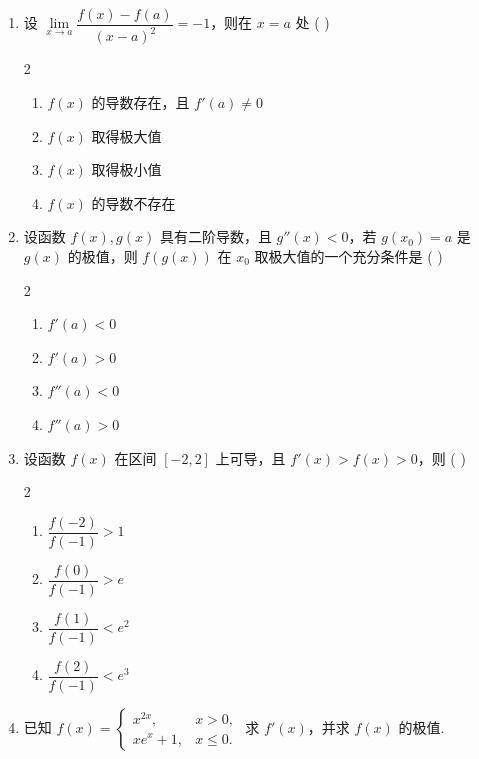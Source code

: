 \begin{enumerate}[label=\textbf{\arabic*.}, itemsep=6cm]
    \item 设 $\lim\limits_{x\to a}\dfrac{f(x)-f(a)}{(x-a)^2}=-1$，则在 $x=a$ 处 ( )
    \begin{multicols}{2}
    \begin{enumerate}
        \item $f(x)$ 的导数存在，且 $f'(a)\ne0$
        \item $f(x)$ 取得极大值
        \item $f(x)$ 取得极小值
        \item $f(x)$ 的导数不存在
    \end{enumerate}
    \end{multicols}
    
    \item 设函数 $f(x),g(x)$ 具有二阶导数，且 $g''(x)<0$，若 $g(x_0)=a$ 是 $g(x)$ 的极值，则 $f(g(x))$ 在 $x_0$ 取极大值的一个充分条件是 ( )
    \begin{multicols}{2}
    \begin{enumerate}
        \item $f'(a)<0$
        \item $f'(a)>0$
        \item $f''(a)<0$
        \item $f''(a)>0$
    \end{enumerate}
    \end{multicols}
    
    \item 设函数 $f(x)$ 在区间 $[-2,2]$ 上可导，且 $f'(x)>f(x)>0$，则 ( )
    \begin{multicols}{2}
    \begin{enumerate}
        \item $\dfrac{f(-2)}{f(-1)}>1$
        \item $\dfrac{f(0)}{f(-1)}>e$
        \item $\dfrac{f(1)}{f(-1)}<e^2$
        \item $\dfrac{f(2)}{f(-1)}<e^3$
    \end{enumerate}
    \end{multicols}
    
    \item 已知 $f(x)=\begin{cases}x^{2x},&x>0,\\xe^x+1,&x\le0.\end{cases}$ 求 $f'(x)$，并求 $f(x)$ 的极值.
\end{enumerate}

